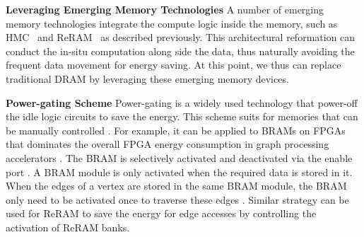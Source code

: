 \documentclass[twoside]{article}
\begin{document}
\begin{multicols}{2}

{\bf Leveraging Emerging Memory Technologies} A number of emerging memory technologies integrate the compute logic inside the memory, such as HMC~\cite{ahn2015tesseract, nai2017graphpim, zhang2018graphp,dai2018graphh} and ReRAM~\cite{song2018graphr,huang2018hyve} as described previously. This architectural reformation can conduct the in-situ computation along side the data, thus naturally avoiding the frequent data movement for energy saving. 
At this point, we thus can replace traditional DRAM by leveraging these emerging memory devices. %

{\bf Power-gating Scheme} Power-gating is a widely used technology that power-off the idle logic circuits to save the energy. This scheme suits for memories that can be manually controlled \cite{zhou2016highthroughput, huang2018hyve}. For example, it can be applied to BRAMs on FPGAs that dominates the overall FPGA energy consumption in graph processing accelerators \cite{zhou2016highthroughput}. The BRAM is selectively activated and deactivated via the enable port \cite{fpgapower}. A BRAM module is only activated when the required data is stored in it. When the edges of a vertex are stored in the same BRAM module, the BRAM only need to be activated once to traverse these edges \cite{zhou2016highthroughput}. Similar strategy can be used for ReRAM \cite{huang2018hyve} to save the energy for edge accesses by controlling the activation of ReRAM banks.


\end{multicols}
\end{document}
